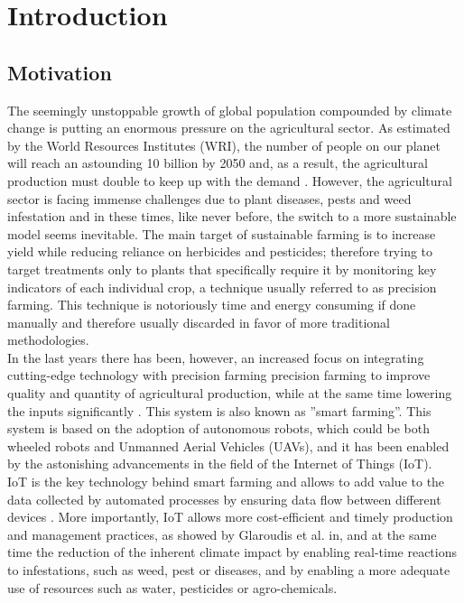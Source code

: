 \chapter{Introduction}
\section{Motivation}
The seemingly unstoppable growth of global population compounded by climate change is putting an enormous pressure on the agricultural sector. As estimated by the World Resources Institutes (WRI), the number of people on our planet will reach an astounding 10 billion by 2050  \cite{ayaz_internet--things_2019} and, as a result, the agricultural production must double to keep up with the demand \cite{singh_machine_2016}. However, the agricultural sector is facing immense challenges due to plant diseases, pests and weed infestation and in these times, like never before, the switch to a more sustainable model seems inevitable. The main target of sustainable farming is to increase yield while reducing reliance on herbicides and pesticides; therefore trying to target treatments only to plants that specifically require it by monitoring key indicators of each individual crop, a technique usually referred to as precision farming. This technique is notoriously time and energy consuming if done manually and therefore usually discarded in favor of more traditional methodologies. \cite{lottes_effective_2016}\\
In the last years there has been, however, an increased focus on integrating cutting-edge technology with precision farming precision farming to improve quality and quantity of agricultural production, while at the same time lowering the inputs significantly \cite{islam_review_2021}.  This system is also known as ''smart farming''.  This system is based on the adoption of autonomous robots, which could be both wheeled robots and Unmanned Aerial Vehicles (UAVs), and it has been enabled by the astonishing advancements in the field of the Internet of Things (IoT). \\
IoT is the key technology behind smart farming and allows to add value to the data collected by automated processes by ensuring data flow between different devices  \cite{islam_review_2021}.  More importantly, IoT allows more cost-efficient and timely production and management practices, as showed by  Glaroudis et al. in\cite{glaroudis_survey_2020}, and at the same time the reduction of the inherent climate impact by enabling real-time reactions to infestations,  such as weed, pest or diseases, and by enabling a more adequate use of resources such as water, pesticides or agro-chemicals.\cite{islam_review_2021}
